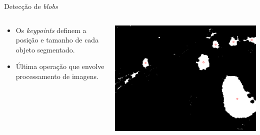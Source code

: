 \begin{frame}{Detecção de \textit{blobs}}
  \begin{columns}[T]
    \begin{column}{.5\textwidth}
      \begin{itemize}
        \item Os \textit{keypoints} definem a posição e tamanho de cada objeto segmentado.
        \item Última operação que envolve processamento de imagens.
      \end{itemize}
    \end{column}
    \begin{column}{.5\textwidth}
      \begin{block}{}
        \includegraphics[width=\textwidth]{imgs/keypoints.png}
      \end{block}
    \end{column}
  \end{columns}
\end{frame}

